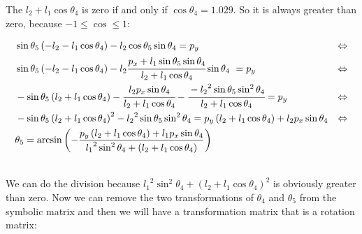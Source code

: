 The \(l_2+l_1\cos\theta_4\) is zero if and only if \(\cos\theta_4 = 1.029\). So it is always greater than zero, because \(-1 \leq \cos \leq 1\):
\begin{small}
\begin{align*}
&\sin\theta_5\left(-l_2-l_1\cos\theta_4\right) - l_2\cos\theta_5\sin\theta_4 = p_y& \Leftrightarrow\\
&\sin\theta_5\left(-l_2-l_1\cos\theta_4\right) - l_2\cfrac{p_x + l_1\sin\theta_5\sin\theta_4}{l_2+l_1\cos\theta_4}\sin\theta_4\ =p_y & \Leftrightarrow\\
&-\sin\theta_5\left(l_2+l_1\cos\theta_4\right) - \cfrac{l_2p_x\sin\theta_4}{l_2+l_1\cos\theta_4} - \cfrac{-{l_2}^2\sin\theta_5\sin^2\theta_4}{l_2+l_1\cos\theta_4} = p_y&\Leftrightarrow\\
&-\sin\theta_5\left(l_2+l_1\cos\theta_4\right)^2 - {l_2}^2\sin\theta_5\sin^2\theta_4 = p_y\left(l_2+l_1\cos\theta_4\right) + l_2p_x\sin\theta_4 & \Leftrightarrow\\
&\theta_5 = \arcsin\left(-\frac{p_y\left(l_2+l_1\cos\theta_4\right) + l_1p_x\sin\theta_4}{{l_1}^2\sin^2\theta_4 + \left(l_2 + l_1\cos\theta_4\right)}\right)
\end{align*}
\end{small}\\
We can do the division because ${l_1}^2\sin^2\theta_4 + \left(l_2 + l_1\cos\theta_4\right)^2$ is obviously greater than zero. 
Now we can remove the two transformations of $\theta_4$ and $\theta_5$ from the symbolic matrix and then we will have a transformation matrix that is a rotation matrix:

